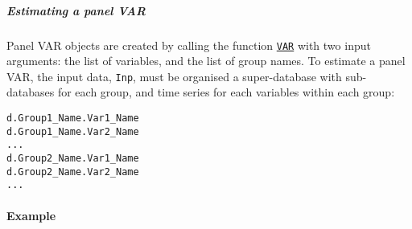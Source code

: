 \subparagraph{Estimating a panel VAR}\label{estimating-a-panel-var}

Panel VAR objects are created by calling the function
\href{VAR/VAR}{\texttt{VAR}} with two input arguments: the list of
variables, and the list of group names. To estimate a panel VAR, the
input data, \texttt{Inp}, must be organised a super-database with
sub-databases for each group, and time series for each variables within
each group:

\begin{verbatim}
d.Group1_Name.Var1_Name
d.Group1_Name.Var2_Name
...
d.Group2_Name.Var1_Name
d.Group2_Name.Var2_Name
...
\end{verbatim}

\paragraph{Example}\label{example}


